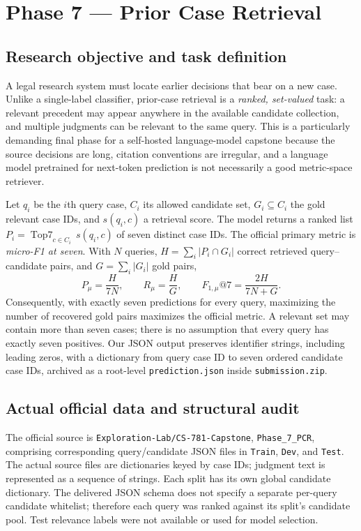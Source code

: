 \section{Phase 7 --- Prior Case Retrieval}
\label{sec:p7}

\subsection{Research objective and task definition}
A legal research system must locate earlier decisions that bear on a new case. Unlike a
single-label classifier, prior-case retrieval is a \emph{ranked, set-valued} task: a
relevant precedent may appear anywhere in the available candidate collection, and
multiple judgments can be relevant to the same query. This is a particularly demanding
final phase for a self-hosted language-model capstone because the source decisions are
long, citation conventions are irregular, and a language model pretrained for
next-token prediction is not necessarily a good metric-space retriever.

Let $q_i$ be the $i$th query case, $C_i$ its allowed candidate set, $G_i\subseteq C_i$
the gold relevant case IDs, and $s(q_i,c)$ a retrieval score. The model returns a
ranked list $P_i=\operatorname{Top7}_{c\in C_i}\,s(q_i,c)$ of seven distinct case IDs.
The official primary metric is \emph{micro-F1 at seven}. With $N$ queries,
$H=\sum_i |P_i\cap G_i|$ correct retrieved query--candidate pairs, and
$G=\sum_i|G_i|$ gold pairs,
\begin{equation}
\label{eq:p7-micro}
P_{\mu}=\frac{H}{7N},\qquad
R_{\mu}=\frac{H}{G},\qquad
F_{1,\mu}@7=\frac{2H}{7N+G}.
\end{equation}
Consequently, with exactly seven predictions for every query, maximizing the number
of recovered gold pairs maximizes the official metric. A relevant set may contain
more than seven cases; there is no assumption that every query has exactly seven
positives. Our JSON output preserves identifier strings, including leading zeros,
with a dictionary from query case ID to seven ordered candidate case IDs, archived
as a root-level \texttt{prediction.json} inside \texttt{submission.zip}.

\subsection{Actual official data and structural audit}
\label{subsec:p7-data}
The official source is \texttt{Exploration-Lab/CS-781-Capstone},
\texttt{Phase\_7\_PCR}, comprising corresponding query/candidate JSON files in
\texttt{Train}, \texttt{Dev}, and \texttt{Test}. The actual source files are
dictionaries keyed by case IDs; judgment text is represented as a sequence of
strings. Each split has its own global candidate dictionary. The delivered JSON
schema does not specify a separate per-query candidate whitelist; therefore each
query was ranked against its split's candidate pool. Test relevance labels were
not available or used for model selection.

